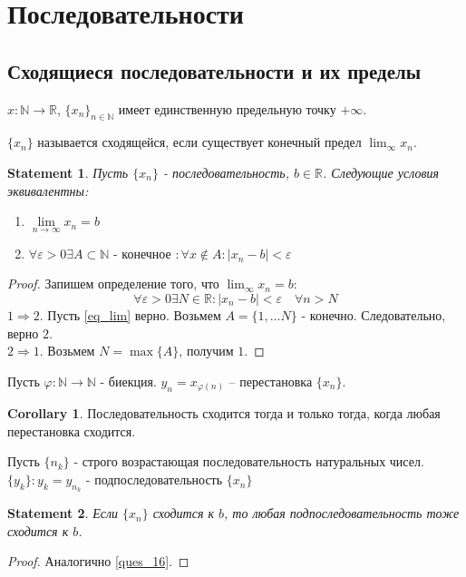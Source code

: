\documentclass[11pt]{book}
\newcommand{\N}{\mathbb{N}}
\newcommand{\R}{\mathbb{R}}
\theoremstyle{definition}
\theoremstyle{plain}
\theoremstyle{plain}
\newtheorem*{st}{Statement}
\theoremstyle{definition}
\newtheorem*{cor}{Corollary}
\theoremstyle{remark}
\begin{document}
\section{Последовательности}
\subsection{Сходящиеся последовательности и их пределы}\label{ques_33}\label{ques_34}
$x : \N \to  \R$, $\{x_n\}_{n \in \N}$ имеет единственную предельную точку $+\infty$.
\begin{defn}
    $\{x_n\} $ называется сходящейся, если существует конечный предел $\lim_{\infty} x_n$.
\end{defn}
\begin{st}
    Пусть $\{x_n\}$ - последовательность, $b \in \R$. Следующие условия эквивалентны:$ $
    \begin{enumerate}
	\item $\lim\limits_{n \to \infty} x_n = b$
	\item $\forall \varepsilon >0 \exists A \subset \N \mbox{ - конечное }: \forall x \notin A : |x_n -b| < \varepsilon $
    \end{enumerate}
\end{st}
\begin{proof}
    Запишем определение того, что $\lim_{\infty} x_n = b$: 
    \begin{equation}\label{eq_lim}
    \forall \varepsilon >0 \exists N \in \R: |x_n - b|<\varepsilon \quad \forall n > N
    \end{equation}
    $1 \Rightarrow 2.$ Пусть \ref{eq_lim} верно.
    Возьмем $A = \{1, \ldots N\}$ - конечно. Следовательно, верно $2$.\\
    $2 \Rightarrow 1$. Возьмем $N = \max \{A\}$, получим $1$.
\end{proof}
\begin{defn}
    Пусть $\varphi : \N \to \N$ - биекция. 
    $y_n = x_{\varphi(n)}$ -- перестановка $\{x_n\}$.
\end{defn}
\begin{cor}
    Последовательность сходится тогда и только тогда, когда любая перестановка сходится.
\end{cor}
\begin{defn}
    Пусть $\{n_k\}$ - строго возрастающая последовательность натуральных чисел.
    $\{y_k\}: y_k = y_{n_k} $ - подпоследовательность $\{x_n\}$
\end{defn}
\begin{st}
    Если $\{x_n\}$ сходится к $b$, то любая подпоследовательность тоже сходится к $b$.
\end{st}
\begin{proof}
    Аналогично \ref{ques_16}. 
\end{proof}
\end{document}
